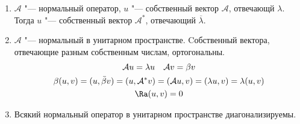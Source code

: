 \begin{conseq}\hfill
	\begin{enumerate}
	\item
		$\mathcal A$ "--- нормальный оператор, $u$ "--- собственный вектор $\mathcal A$, отвечающй  $\lambda$.
		Тогда $u$ "--- собственный вектор $\mathcal{A}^*$, отвечающий $\overline{\lambda}$.
	
	\item
		$\mathcal A$ "--- нормальный в унитарном пространстве.
		Cобственный вектора, отвечающие разным собственным числам, ортогональны.
		\begin{gather*}
			\mathcal Au = \lambda u \quad \mathcal Av = \beta v \\
			\beta(u, v) = (u, \bar \beta v) = (u, \mathcal{A}^*v) = (\mathcal Au, v) = (\lambda u, v) = \lambda (u, v) \\
			\Ra (u, v) = 0
		\end{gather*}
	
	\item
		Всякий нормальный оператор в унитарном пространстве диагонализируемы.
	\end{enumerate}
\end{conseq}


